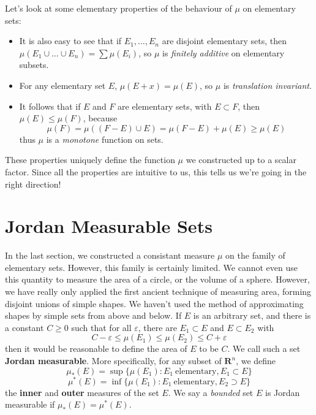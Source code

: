 Let's look at some elementary properties of the behaviour of $\mu$ on elementary sets:
%
\begin{itemize}
    \item It is also easy to see that if $E_1, \dots, E_n$ are disjoint elementary sets, then $\mu(E_1 \cup \dots \cup E_n) = \sum \mu(E_i)$, so $\mu$ is {\it finitely additive} on elementary subsets.

    \item For any elementary set $E$, $\mu(E + x) = \mu(E)$, so $\mu$ is {\it translation invariant}.

    \item It follows that if $E$ and $F$ are elementary sets, with $E \subset F$, then $\mu(E) \leq \mu(F)$, because
    \[ \mu(F) = \mu((F - E) \cup E) = \mu(F-E) + \mu(E) \geq \mu(E) \]
    thus $\mu$ is a {\it monotone} function on sets.
\end{itemize}
%
These properties uniquely define the function $\mu$ we constructed up to a scalar factor. Since all the properties are intuitive to us, this tells us we're going in the right direction!

\section{Jordan Measurable Sets}

In the last section, we constructed a consistant measure $\mu$ on the family of elementary sets. However, this family is certainly limited. We cannot even use this quantity to measure the area of a circle, or the volume of a sphere. However, we have really only applied the first ancient technique of measuring area, forming disjoint unions of simple shapes. We haven't used the method of approximating shapes by simple sets from above and below. If $E$ is an arbitrary set, and there is a constant $C \geq 0$ such that for all $\varepsilon$, there are $E_1 \subset E$ and $E \subset E_2$ with
%
\[ C - \varepsilon \leq \mu(E_1) \leq \mu(E_2) \leq C + \varepsilon \]
%
then it would be reasonable to define the area of $E$ to be $C$. We call such a set {\bf Jordan measurable}. More specifically, for any subset of $\mathbf{R}^n$, we define
%
\[ \mu_*(E) = \sup \{ \mu(E_1): E_1\ \text{elementary}, E_1 \subset E \} \]
\[ \mu^*(E) = \inf \{ \mu(E_1): E_1\ \text{elementary}, E_2 \supset E \} \]
%
the {\bf inner} and {\bf outer} measures of the set $E$. We say a {\it bounded} set $E$ is Jordan measurable if $\mu_*(E) = \mu^*(E)$.

